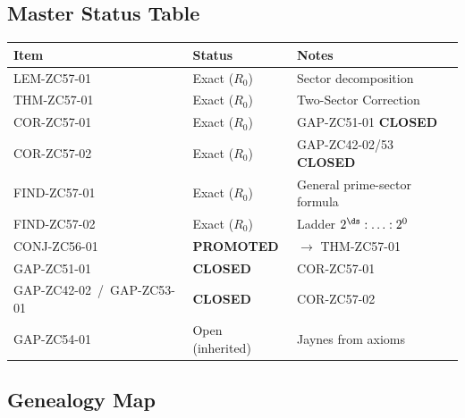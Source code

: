 \documentclass[12pt, a4paper]{article}
\begin{document}
\subsection{Master Status Table}

\begin{center}
\begin{tabular}{@{}lp{4.5cm}p{4cm}@{}}
\toprule
\textbf{Item} & \textbf{Status} & \textbf{Notes} \\
\midrule
LEM-ZC57-01 & Exact ($R_0$) & Sector decomposition \\
THM-ZC57-01 & Exact ($R_0$) & Two-Sector Correction \\
COR-ZC57-01 & Exact ($R_0$) & GAP-ZC51-01 \textbf{CLOSED} \\
COR-ZC57-02 & Exact ($R_0$) & GAP-ZC42-02/53 \textbf{CLOSED} \\
FIND-ZC57-01 & Exact ($R_0$) & General prime-sector formula \\
FIND-ZC57-02 & Exact ($R_0$) & Ladder $2^{\ds}:\ldots:2^0$ \\
\midrule
CONJ-ZC56-01 & \textbf{PROMOTED} & $\to$ THM-ZC57-01 \\
GAP-ZC51-01  & \textbf{CLOSED}   & COR-ZC57-01 \\
GAP-ZC42-02~/~GAP-ZC53-01 & \textbf{CLOSED} & COR-ZC57-02 \\
GAP-ZC54-01  & Open (inherited)  & Jaynes from axioms \\
\bottomrule
\end{tabular}
\end{center}

\subsection{Genealogy Map}
\end{document}
